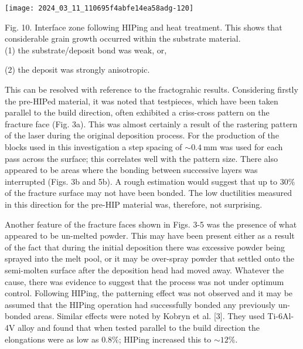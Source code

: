\documentclass[10pt]{article}
\begin{document}
\begin{center}
\texttt{[image: 2024\_03\_11\_110695f4abfe14ea58adg-120]}
\end{center}

Fig. 10. Interface zone following HIPing and heat treatment. This shows that considerable grain growth occurred within the substrate material.\\
(1) the substrate/deposit bond was weak, or,

(2) the deposit was strongly anisotropic.

This can be resolved with reference to the fractograhic results. Considering firstly the pre-HIPed material, it was noted that testpieces, which have been taken parallel to the build direction, often exhibited a criss-cross pattern on the fracture face (Fig. 3a). This was almost certainly a result of the rastering pattern of the laser during the original deposition process. For the production of the blocks used in this investigation a step spacing of $\sim 0.4 \mathrm{~mm}$ was used for each pass across the surface; this correlates well with the pattern size. There also appeared to be areas where the bonding between successive layers was interrupted (Figs. 3b and 5b). A rough estimation would suggest that up to $30 \%$ of the fracture surface may not have been bonded. The low ductilities measured in this direction for the pre-HIP material was, therefore, not surprising.

Another feature of the fracture faces shown in Figs. 3-5 was the presence of what appeared to be un-melted powder. This may have been present either as a result of the fact that during the initial deposition there was excessive powder being sprayed into the melt pool, or it may be over-spray powder that settled onto the semi-molten surface after the deposition head had moved away. Whatever the cause, there was evidence to suggest that the process was not under optimum control. Following HIPing, the patterning effect was not observed and it may be assumed that the HIPing operation had successfully bonded any previously un-bonded areas. Similar effects were noted by Kobryn et al. [3]. They used Ti-6Al-4V alloy and found that when tested parallel to the build direction the elongations were as low as $0.8 \%$; HIPing increased this to $\sim 12 \%$.
\end{document}
